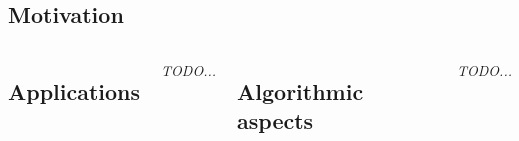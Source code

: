 \begin{frame}
    \section{Motivation}
    \begin{columns}[T]
    \subsection*{Applications}
    \emph{TODO...}
    \subsection*{Algorithmic aspects}
    \emph{TODO...}
    \end{columns}
\end{frame}

